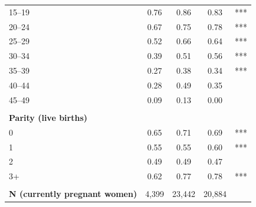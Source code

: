 \begin{tabular}{lcccc}
\hspace*{2em}15--19&0.76&0.86&0.83&***\\
\hspace*{2em}20--24&0.67&0.75&0.78&***\\
\hspace*{2em}25--29&0.52&0.66&0.64&***\\
\hspace*{2em}30--34&0.39&0.51&0.56&***\\
\hspace*{2em}35--39&0.27&0.38&0.34&***\\
\hspace*{2em}40--44&0.28&0.49&0.35&\\
\hspace*{2em}45--49&0.09&0.13&0.00&\\
&&&&\\
\textbf{Parity (live births)}&&&&\\
\hspace*{2em}0&0.65&0.71&0.69&***\\
\hspace*{2em}1&0.55&0.55&0.60&***\\
\hspace*{2em}2&0.49&0.49&0.47&\\
\hspace*{2em}3+&0.62&0.77&0.78&***\\
&&&&\\
\textbf{N (currently pregnant women)}&4,399&23,442&20,884&\\
\bottomrule
\end{tabular}
